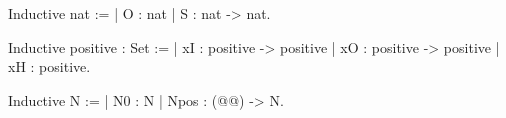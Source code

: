 




Inductive nat :=
| O : nat
| S : nat -> nat.

Inductive positive : Set :=
| xI : positive -> positive
| xO : positive -> positive 
| xH : positive.

Inductive N :=
| N0 : N 
| Npos : (@@) -> N.
